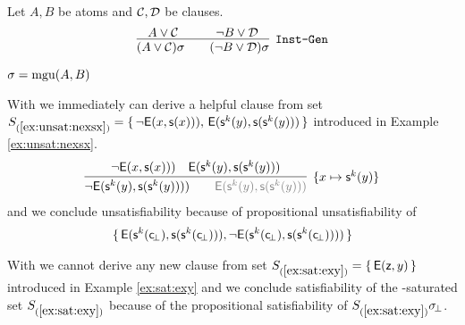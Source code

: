 \begin{definition}[\InstGen] Let $A, B$ be atoms and $\mathcal{C},\mathcal{D}$ be clauses.
	\begin{gather*}
	\infer
	[{\InstGen}]
	{(A\lor\mathcal C)\sigma\qquad (\lnot B\lor\mathcal D)\sigma}
	{A\lor\mathcal C\quad&\quad \lnot B\lor\mathcal D}
	\end{gather*}
	\begin{center}$\sigma=\operatorname{mgu}(A,B)$
	\end{center}
\end{definition}

\begin{example}
	With \InstGen we immediately can derive a helpful clause from set
$S_{(\ref{ex:unsat:nexsx})} =
\{\,
{ \lnot\mathsf{E}(x, \mathsf{s}(x)))},\,
{ \mathsf{E}(\mathsf{s}^k(y), \mathsf{s}(\mathsf{s}^k(y)))}
\,\}$
 introduced in Example \ref{ex:unsat:nexsx}.
\begin{gather*}
\infer[\{x\mapsto\msucc^k(y)\}]{
	{ \lnot\mE(\msucc^k(y), \msucc(\msucc^k(y))))} \qquad
	{\colG \mE(\msucc^k(y), \msucc(\msucc^k(y)))}
}{
	{ \lnot\mE(x, \msucc(x)))} &
	{ \mE(\msucc^k(y), \msucc(\msucc^k(y)))}
}
\end{gather*}
and we conclude unsatisfiability because of propositional unsatisfiability of
\begin{gather*}
\{\,
	\mathsf{E}(\mathsf{s}^k(\mathsf{c}\!_\bot), \mathsf{s}(\mathsf{s}^k(\mathsf{c}\!_\bot))), \lnot\mathsf{E}(\mathsf{s}^k(\mathsf{c}\!_\bot), \mathsf{s}(\mathsf{s}^k(\mathsf{c}\!_\bot))))
\,\}
\end{gather*}

\end{example}

\begin{example}
	With \InstGen we cannot derive any new clause from set
	$S_{(\ref{ex:sat:exy})  } = \{\,\mathsf{E}(\mathsf{z},y)\,\}$
	introduced in Example \ref{ex:sat:exy} and we conclude satisfiability
	of the \InstGen-saturated set $S_{(\ref{ex:sat:exy})  }$
	because of the propositional satisfiability of $S_{(\ref{ex:sat:exy})  }\sigma\!_\bot$.
\end{example}

